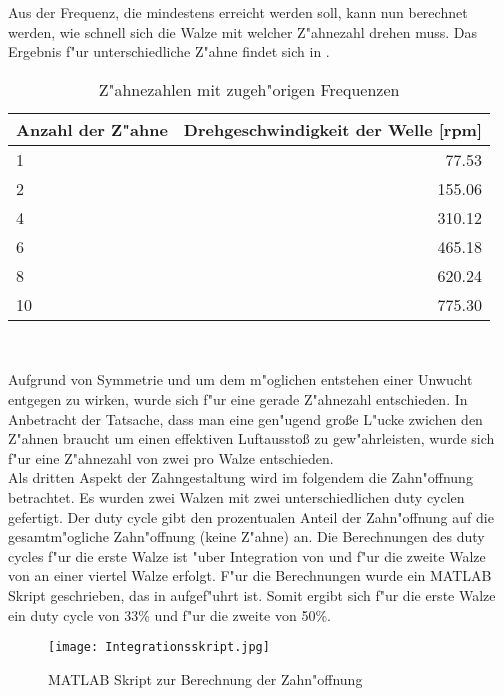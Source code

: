 Aus der Frequenz, die mindestens erreicht werden soll, kann nun berechnet werden, wie schnell sich die Walze mit welcher Z"ahnezahl drehen muss. Das Ergebnis f"ur unterschiedliche Z"ahne findet sich in .\\
\begin{table}[h]
	\centering
	\begin{tabular}{lr}
		\toprule
		Anzahl der Z"ahne & Drehgeschwindigkeit der Welle [rpm]\\
		\midrule
		1 & 77.53\\
		2 & 155.06\\
		4 & 310.12\\
		6 & 465.18\\
		8 & 620.24\\
		10 & 775.30\\
		\bottomrule
	\end{tabular}\\
	\caption{Z"ahnezahlen mit zugeh"origen Frequenzen}
	\label{tab:zahnezahl}
\end{table}
Aufgrund von Symmetrie und um dem m"oglichen entstehen einer Unwucht entgegen zu wirken, wurde sich f"ur eine gerade Z"ahnezahl entschieden. In Anbetracht der Tatsache, dass man eine gen"ugend gro\ss{}e L"ucke zwichen den Z"ahnen braucht um einen effektiven Luftaussto\ss{} zu gew"ahrleisten, wurde sich f"ur eine Z"ahnezahl von zwei pro Walze entschieden.\\

Als dritten Aspekt der Zahngestaltung wird im folgendem die Zahn"offnung betrachtet. Es wurden zwei Walzen mit zwei unterschiedlichen duty cyclen gefertigt. Der duty cycle gibt den prozentualen Anteil der Zahn"offnung auf die gesamtm"ogliche Zahn"offnung (keine Z"ahne) an. Die Berechnungen des duty cycles f"ur die erste Walze ist "uber Integration von  und f"ur die zweite Walze von  an einer viertel Walze erfolgt. F"ur die Berechnungen wurde ein MATLAB Skript geschrieben, das in  aufgef"uhrt ist. Somit ergibt sich f"ur die erste Walze ein duty cycle von 33\% und f"ur die zweite von 50\%.
\begin{figure}[h]
	\centering
	\texttt{[image: Integrationsskript.jpg]}
	\caption{MATLAB Skript zur Berechnung der Zahn"offnung}
	\label{fig:Integrationsskript}
\end{figure}\\

